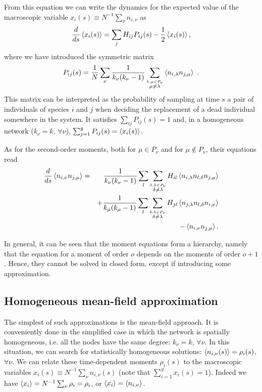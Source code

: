 From this equation we can write the dynamics for the expected
value of the macroscopic variable $x_i(s) \equiv N^{-1}\sum_\nu
n_{i,\nu}$ as 
\begin{equation}
\label{eq:xintermsofP}
  \frac{d}{ds} \left\langle x_i(s)\right\rangle =
  \sum_{j} H_{ij} P_{ij}(s) - \frac12 \left\langle x_i(s)\right\rangle ,
\end{equation}
where we have introduced the symmetric matrix
\begin{equation}
\label{eq:Ps}
  P_{ij}(s) = \frac{1}{N} \sum_\nu \frac{1}{k_\nu (k_\nu -1)}
  \sum_{\stackrel{\lambda,\mu\in P_\nu}{\mu\neq \lambda}} \left\langle n_{i,\lambda}n_{j,\mu}\right\rangle \ .
\end{equation}
This matrix can be interpreted as the probability of sampling
at time $s$ a pair of individuals of species $i$ and $j$ when
deciding the replacement of a dead individual somewhere in the
system. It satisfies  $\sum_{ij} P_{ij}(s) =1$
and, in a homogeneous network ($k_\nu=k$, $\forall \nu$),
$\sum_{j=1}^g P_{ij}(s)=\left\langle x_i(s)\right\rangle$.


As for the second-order moments, both for $\mu \in P_{\nu}$ and
for $\mu\notin P_\nu$, their equations read
\begin{eqnarray}
\nonumber
  \frac{d}{ds} \left\langle n_{i,\nu}n_{j,\mu}\right\rangle =&&\frac{1}{k_\nu(k_\nu-1)}
  \sum_{l}\sum_{\stackrel{\delta,\lambda\in P_\nu}{\delta\ne \lambda}}H_{il}\left\langle n_{i,\lambda}n_{l,\delta}n_{j,\mu}\right\rangle \\
  && + \frac{1}{k_\mu(k_\mu-1)}
  \sum_{l} \sum_{\stackrel{\delta,\lambda\in P_\nu}{\delta\ne \lambda}}H_{jl}\left\langle n_{j,\lambda}n_{l,\delta}n_{i,\nu}\right\rangle \nonumber \\ &&-\left\langle n_{i,\nu}n_{j,\mu}\right\rangle.
\label{eq:ninj}
\end{eqnarray}

In general, it can be seen that the moment equations form a
hierarchy, namely that the equation for a moment of order $o$
depends on the moments of order $o+1$. Hence, they cannot be
solved in closed form, except if introducing some
approximation.

\subsection{Homogeneous mean-field approximation}
\label{sec:mf}

The simplest of such approximations is the mean-field approach.
It is conveniently done in the simplified case in which the
network is spatially homogeneous, i.e. all the nodes have the
same degree: $k_\nu=k$, $\forall \nu$. In this situation, we
can search for statistically homogeneous solutions:
$\left\langle n_{i,\nu}(s)\right\rangle=\rho_i(s)$, $\forall \nu$. We can relate
these time-dependent moments $\rho_i(s)$ to the macroscopic
variables $x_i(s) \equiv N^{-1}\sum_\nu n_{i,\nu}(s)$ (note
that $\sum_{i=1}^g x_i(s)=1$). Indeed we have
$\left\langle x_i\right\rangle=N^{-1}\sum_\nu \rho_i=\rho_i$, or
$\left\langle x_i\right\rangle=\left\langle n_{i,\nu}\right\rangle$.


